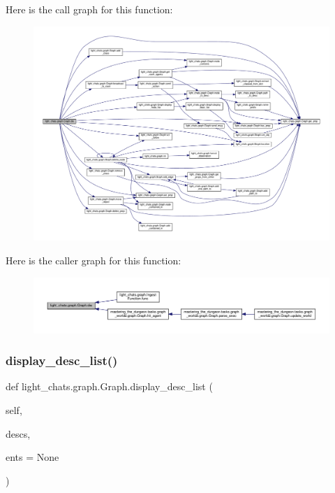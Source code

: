 Here is the call graph for this function\+:
\nopagebreak
\begin{figure}[H]
\begin{center}
\leavevmode
\includegraphics[width=350pt]{classlight__chats_1_1graph_1_1Graph_a74bc5374a9c9f411008e726fac4cd7f1_cgraph}
\end{center}
\end{figure}
Here is the caller graph for this function\+:
\nopagebreak
\begin{figure}[H]
\begin{center}
\leavevmode
\includegraphics[width=350pt]{classlight__chats_1_1graph_1_1Graph_a74bc5374a9c9f411008e726fac4cd7f1_icgraph}
\end{center}
\end{figure}
\mbox{\label{classlight__chats_1_1graph_1_1Graph_a32111f6e4bae319c37f6d8de8dd2bbbe}} 
\subsubsection{\texorpdfstring{display\+\_\+desc\+\_\+list()}{display\_desc\_list()}}
{\footnotesize\ttfamily def light\+\_\+chats.\+graph.\+Graph.\+display\+\_\+desc\+\_\+list (\begin{DoxyParamCaption}\item[{}]{self,  }\item[{}]{descs,  }\item[{}]{ents = {\ttfamily None} }\end{DoxyParamCaption})}




